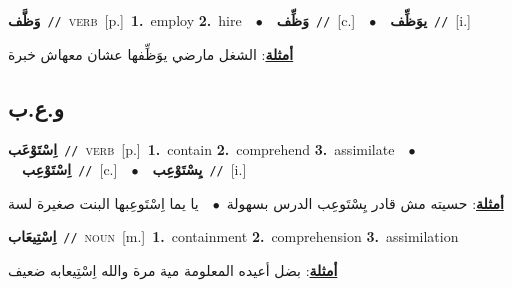 \documentclass[10pt,a4paper,twoside]{article} %
\begin{document}
\begin{multicols}{2}
{\setlength\topsep{0pt}\textbf{\foreignlanguage{arabic}{وَظَّف}}\ {\color{gray}\texttt{//}\color{black}}\ \textsc{verb}\ [p.]\ \textbf{1.}~employ  \textbf{2.}~hire\ \ $\bullet$\ \ \setlength\topsep{0pt}\textbf{\foreignlanguage{arabic}{وَظِّف}}\ {\color{gray}\texttt{//}\color{black}}\ [c.]\ \ $\bullet$\ \ \setlength\topsep{0pt}\textbf{\foreignlanguage{arabic}{يوَظِّف}}\ {\color{gray}\texttt{//}\color{black}}\ [i.]\  \begin{flushright}\color{gray}\foreignlanguage{arabic}{\textbf{\underline{\foreignlanguage{arabic}{أمثلة}}}: الشغل مارضي يوَظِّفها عشان معهاش خبرة}\end{flushright}\color{black}} \vspace{2mm}

\vspace{-3mm}
\subsection*{\color{blue}\foreignlanguage{arabic}{و.ع.ب}\color{blue}{}} 

{\setlength\topsep{0pt}\textbf{\foreignlanguage{arabic}{اِسْتَوْعَب}}\ {\color{gray}\texttt{//}\color{black}}\ \textsc{verb}\ [p.]\ \textbf{1.}~contain  \textbf{2.}~comprehend  \textbf{3.}~assimilate\ \ $\bullet$\ \ \setlength\topsep{0pt}\textbf{\foreignlanguage{arabic}{اِسْتَوْعِب}}\ {\color{gray}\texttt{//}\color{black}}\ [c.]\ \ $\bullet$\ \ \setlength\topsep{0pt}\textbf{\foreignlanguage{arabic}{يِسْتَوْعِب}}\ {\color{gray}\texttt{//}\color{black}}\ [i.]\  \begin{flushright}\color{gray}\foreignlanguage{arabic}{\textbf{\underline{\foreignlanguage{arabic}{أمثلة}}}: حسيته مش قادر يِسْتَوعِب الدرس بسهولة\ $\bullet$\ \  يا يما اِسْتَوعِبها البنت صغيرة لسة}\end{flushright}\color{black}} \vspace{2mm}

{\setlength\topsep{0pt}\textbf{\foreignlanguage{arabic}{اِسْتِيعَاب}}\ {\color{gray}\texttt{//}\color{black}}\ \textsc{noun}\ [m.]\ \textbf{1.}~containment  \textbf{2.}~comprehension  \textbf{3.}~assimilation\  \begin{flushright}\color{gray}\foreignlanguage{arabic}{\textbf{\underline{\foreignlanguage{arabic}{أمثلة}}}: بضل أعيده المعلومة مية مرة والله اِسْتِيعابه ضعيف}\end{flushright}\color{black}} \vspace{2mm}


\end{multicols}
\end{document}

